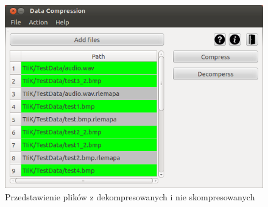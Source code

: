 \documentclass[12pt,a4paper,notitlepage]{report}
\begin{document}
\begin{figure}[H]
	\centering
	\includegraphics[scale=.7]{all}
	\caption{Przedstawienie plików z dekompresowanych i nie skompresowanych}
\end{figure}
\end{document}
